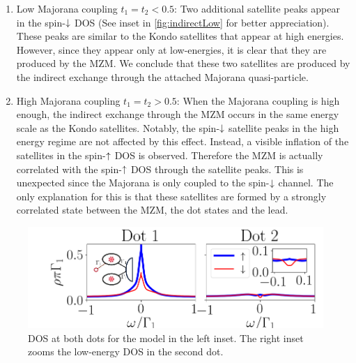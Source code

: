 \begin{enumerate}
 \item Low Majorana coupling $t_1=t_2 < 0.5$: Two additional satellite peaks appear in the spin-$\downarrow$ DOS (See inset in \ref{fig:indirectLow} for better appreciation). These peaks are similar to the  Kondo satellites that appear at high energies. However, since they appear only at low-energies, it is clear that they are produced by the MZM. We conclude that these two satellites are produced by the indirect exchange through the attached  Majorana quasi-particle. 
 \item High Majorana coupling $t_1=t_2 > 0.5$: When the Majorana coupling is high enough, the indirect exchange through the MZM occurs in the same energy scale as the Kondo satellites. Notably, the spin-$\downarrow$ satellite peaks in the high energy regime are not affected by this effect. Instead, a visible inflation of the satellites in the spin-$\uparrow$ DOS is observed. Therefore the MZM is actually correlated with the spin-$\uparrow$ DOS through the satellite peaks. This is unexpected since the Majorana is only coupled to the spin-$\downarrow$ channel.  The only explanation for this is that these satellites are formed by a strongly correlated state between the MZM, the dot states and the lead. 
\end{enumerate}
\begin{figure}[h]
\centering
\includegraphics[scale=0.64]{IMAGES/NRG/IND.png}
\caption{\label{fig:IND} DOS at both dots for the model in the left inset. The right inset zooms the low-energy DOS in the second dot.\protect\Source{} }
\end{figure} 




